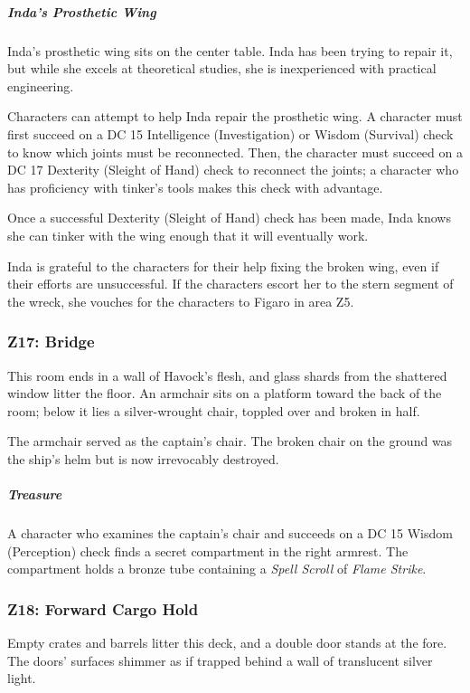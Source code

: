 \documentclass[10pt,a4paper,twoside,bg=print,twocolumn,openany,nodeprecatedcode]{dndbook}
\begin{document}
\subparagraph{Inda's Prosthetic Wing}
Inda's prosthetic wing sits on the center table. Inda has been trying to repair it, but while she excels at theoretical studies, she is inexperienced with practical engineering.

Characters can attempt to help Inda repair the prosthetic wing. A character must first succeed on a DC 15 Intelligence (Investigation) or Wisdom (Survival) check to know which joints must be reconnected. Then, the character must succeed on a DC 17 Dexterity (Sleight of Hand) check to reconnect the joints; a character who has proficiency with tinker's tools makes this check with advantage.

Once a successful Dexterity (Sleight of Hand) check has been made, Inda knows she can tinker with the wing enough that it will eventually work.

Inda is grateful to the characters for their help fixing the broken wing, even if their efforts are unsuccessful. If the characters escort her to the stern segment of the wreck, she vouches for the characters to Figaro in area Z5.

\subsubsection{Z17: Bridge}
\begin{DndReadAloud}{}
This room ends in a wall of Havock's flesh, and glass shards from the shattered window litter the floor. An armchair sits on a platform toward the back of the room; below it lies a silver-wrought chair, toppled over and broken in half.

\end{DndReadAloud}

The armchair served as the captain's chair. The broken chair on the ground was the ship's helm but is now irrevocably destroyed.

\subparagraph{Treasure}
A character who examines the captain's chair and succeeds on a DC 15 Wisdom (Perception) check finds a secret compartment in the right armrest. The compartment holds a bronze tube containing a \textit{Spell Scroll} of \textit{Flame Strike}.

\subsubsection{Z18: Forward Cargo Hold}
\begin{DndReadAloud}{}
Empty crates and barrels litter this deck, and a double door stands at the fore. The doors' surfaces shimmer as if trapped behind a wall of translucent silver light.

\end{DndReadAloud}
\end{document}
